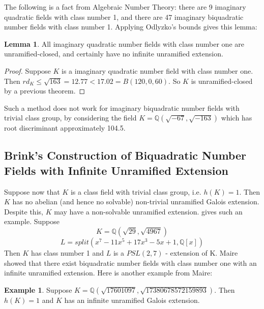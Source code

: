 \documentclass[12pt]{extarticle}
\newcommand{\Q}{\mathbb{Q}}
\newcommand{\<}{\langle}
\renewcommand{\>}{\rangle}
\theoremstyle{definition}
\newtheorem*{example}{Example}
\newtheorem{lemma}{Lemma}
\begin{document}
The following is a fact from Algebraic Number Theory: there are 9 imaginary quadratic fields with class number 1, and there are 47 imaginary biquadratic number fields with class number 1. Applying Odlyzko's bounds gives this lemma:
\begin{lemma}
All imaginary quadratic number fields with class number one are unramified-closed, and certainly have no infinite unramified extension.  
\end{lemma}
\begin{proof}
Suppose $K$ is a imaginary quadratic number field with class number one. Then $rd_K \leq \sqrt{163} = 12.77 < 17.02 = B(120,0,60)$. So $K$ is unramified-closed by a previous theorem. 
\end{proof}
Such a method does not work for imaginary biquadratic number fields with trivial class group, by considering the field $K=\Q(\sqrt{-67},\sqrt{-163})$ which has root discriminant approximately 104.5.

\subsection{Brink's Construction of Biquadratic Number Fields with Infinite Unramified Extension}

Suppose now that $K$ is a class field with trivial class group, i.e. $h(K)=1$. Then $K$ has no abelian (and hence no
solvable) non-trivial unramified Galois extension. Despite this, $K$ may have a non-solvable unramified extension. \cite{BRINK} gives such an example. Suppose
\begin{equation}
   K=\Q(\sqrt{29},\sqrt{4967}) 
\end{equation}
\begin{equation}
   L=split(x^7 - 11x^5 + 17x^3 - 5x + 1,\Q[x])
\end{equation}
Then $K$ has class number 1 and $L$ is a $PSL(2, 7)$ - extension of K.
Maire \cite{MAIR} showed that there exist biquadratic number fields with class number one with an infinite unramified extension. Here is another example from Maire: 
\begin{example}
Suppose $K= \Q( \sqrt{17601097}, \sqrt{17380678572159893})$. Then $h(K)=1$ and $K$ has an infinite unramified Galois extension. 
\end{example}
\end{document}
